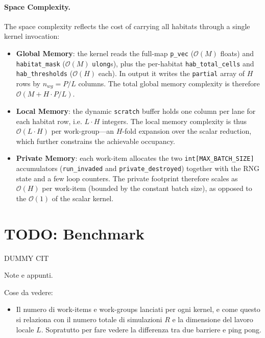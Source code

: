 \paragraph{Space Complexity.}
The space complexity reflects the cost of carrying all habitats through a single kernel invocation:
\begin{itemize}
    \item \textbf{Global Memory}: the kernel reads the full-map \texttt{p\_vec} ($\mathcal{O}(M)$ floats) and \texttt{habitat\_mask} ($\mathcal{O}(M)$ \texttt{ulong}s), plus the per-habitat \texttt{hab\_total\_cells} and \texttt{hab\_thresholds} ($\mathcal{O}(H)$ each). In output it writes the \texttt{partial} array of $H$ rows by $n_{wg} = P/L$ columns. The total global memory complexity is therefore $\mathcal{O}(M + H \cdot P/L)$.

    \item \textbf{Local Memory}: the dynamic \texttt{scratch} buffer holds one column per lane for each habitat row, i.e. $L \cdot H$ integers. The local memory complexity is thus $\mathcal{O}(L \cdot H)$ per work-group---an $H$-fold expansion over the scalar reduction, which further constrains the achievable occupancy.

    \item \textbf{Private Memory}: each work-item allocates the two \texttt{int[MAX\_BATCH\_SIZE]} accumulators (\texttt{run\_invaded} and \texttt{private\_destroyed}) together with the RNG state and a few loop counters. The private footprint therefore scales as $\mathcal{O}(H)$ per work-item (bounded by the constant batch size), as opposed to the $\mathcal{O}(1)$ of the scalar kernel.
\end{itemize}


\section{TODO: Benchmark}\label{sec:benchmark}

DUMMY CIT \cite{williams2009roofline}

Note e appunti.

Cose da vedere:
\begin{itemize}
    \item Il numero di work-items e work-groups lanciati per ogni kernel, e come questo si relaziona con il numero totale di simulazioni $R$ e la dimensione del lavoro locale $L$. Sopratutto per fare vedere la differenza tra due barriere e ping pong.
\end{itemize}